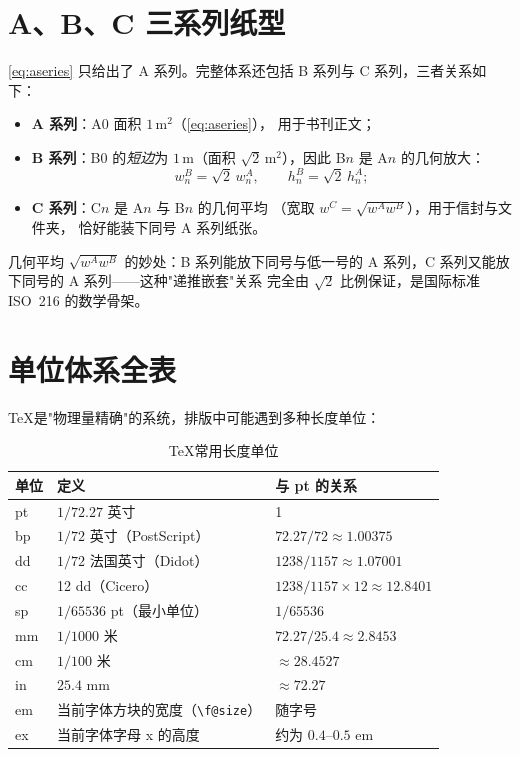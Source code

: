 \section{A、B、C 三系列纸型}

\eqref{eq:aseries} 只给出了 A 系列。完整体系还包括 B 系列与
C 系列，三者关系如下：

\begin{itemize}
  \item \textbf{A 系列}：A0 面积 $1\,\mathrm{m}^2$（\eqref{eq:aseries}），
        用于书刊正文；
  \item \textbf{B 系列}：B0 的\emph{短边}为 $1\,\mathrm{m}$（面积
        $\sqrt{2}\,\mathrm{m}^2$），因此 B$n$ 是 A$n$ 的几何放大：
        \begin{equation}
          w_n^{B} = \sqrt{2}\, w_n^{A}, \qquad
          h_n^{B} = \sqrt{2}\, h_n^{A};
          \label{eq:bseries}
        \end{equation}
  \item \textbf{C 系列}：C$n$ 是 A$n$ 与 B$n$ 的几何平均
        （宽取 $w^C = \sqrt{w^A w^B}$），用于信封与文件夹，
        恰好能装下同号 A 系列纸张。
\end{itemize}

\begin{remark}
几何平均 $\sqrt{w^A w^B}$ 的妙处：B 系列能放下同号与低一号的
A 系列，C 系列又能放下同号的 A 系列——这种"递推嵌套"关系
完全由 $\sqrt{2}$ 比例保证，是国际标准 ISO~216 的数学骨架。
\end{remark}

\section{单位体系全表}

\TeX 是"物理量精确"的系统，排版中可能遇到多种长度单位：

\begin{table}[htbp]
  \centering
  \caption{\TeX 常用长度单位}\label{tab:units}
  \begin{tabular}{lll}
    \toprule
    单位 & 定义 & 与 pt 的关系 \\
    \midrule
    pt & $1/72.27$ 英寸 & 1 \\
    bp & $1/72$ 英寸（PostScript） & $72.27/72 \approx 1.00375$ \\
    dd & $1/72$ 法国英寸（Didot） & $1238/1157 \approx 1.07001$ \\
    cc & 12 dd（Cicero） & $1238/1157 \times 12 \approx 12.8401$ \\
    sp & $1/65536$ pt（最小单位） & $1/65536$ \\
    mm & $1/1000$ 米 & $72.27/25.4 \approx 2.8453$ \\
    cm & $1/100$ 米 & $\approx 28.4527$ \\
    in & $25.4$ mm & $\approx 72.27$ \\
    em & 当前字体方块的宽度（\texttt{\textbackslash f@size}）& 随字号 \\
    ex & 当前字体字母 x 的高度 & 约为 $0.4$--$0.5$ em \\
    \bottomrule
  \end{tabular}
\end{table}

